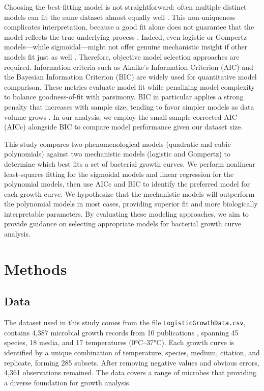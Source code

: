 \documentclass[11pt]{article}
\begin{document}
Choosing the best-fitting model is not straightforward: often multiple distinct models can fit the same dataset almost equally well \citep{JohnsonOmland2004}. This non-uniqueness complicates interpretation, because a good fit alone does not guarantee that the model reflects the true underlying process \citep{JohnsonOmland2004}. Indeed, even logistic or Gompertz models—while sigmoidal—might not offer genuine mechanistic insight if other models fit just as well \citep{BolkerEtAl2013}. Therefore, objective model selection approaches are required. Information criteria such as Akaike’s Information Criterion (AIC) and the Bayesian Information Criterion (BIC) are widely used for quantitative model comparison. These metrics evaluate model fit while penalizing model complexity to balance goodness-of-fit with parsimony. BIC in particular applies a strong penalty that increases with sample size, tending to favor simpler models as data volume grows \citep{BurnhamAnderson2004}. In our analysis, we employ the small-sample corrected AIC (AICc) alongside BIC to compare model performance given our dataset size.

This study compares two phenomenological models (quadratic and cubic polynomials) against two mechanistic models (logistic and Gompertz) to determine which best fits a set of bacterial growth curves. We perform nonlinear least-squares fitting for the sigmoidal models and linear regression for the polynomial models, then use AICc and BIC to identify the preferred model for each growth curve. We hypothesize that the mechanistic models will outperform the polynomial models in most cases, providing superior fit and more biologically interpretable parameters. By evaluating these modeling approaches, we aim to provide guidance on selecting appropriate models for bacterial growth curve analysis.

\section{Methods}
\subsection{Data}
The dataset used in this study comes from the file \texttt{LogisticGrowthData.csv}, contains 4,387 microbial growth records from 10 publications \citep{BaeEtAl2014, BernhardtEtAl2018, GalarzEtAl2016, GillDeLacy1991, PhillipsGriffiths1987, RothWheaton1962, SilvaEtAl2018, Sivonen1990, StannardEtAl1985, ZwieteringEtAl1994}, spanning 45 species, 18 media, and 17 temperatures (0°C–37°C). Each growth curve is identified by a unique combination of temperature, species, medium, citation, and replicate, forming 285 subsets. After removing negative values and obvious errors, 4,361 observations remained. The data covers a range of microbes that providing a diverse foundation for growth analysis.
\end{document}
